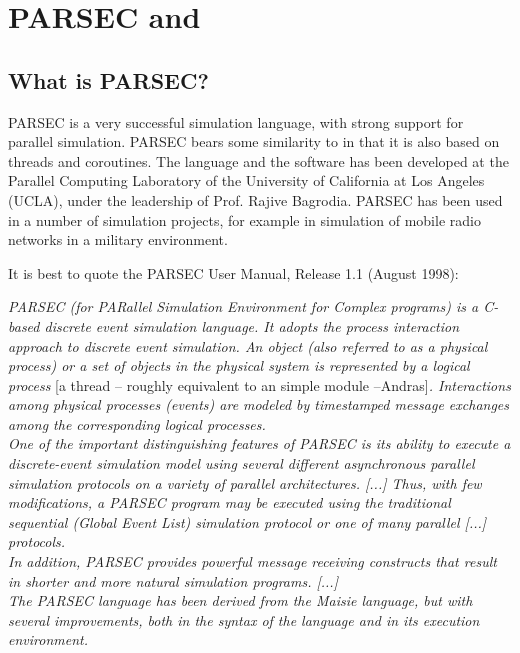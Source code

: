 \chapter{PARSEC and {\opp}}
\label{cha:parsec-and-omnet}


\section{What is PARSEC?}

PARSEC is a very successful simulation language, with
strong support for parallel simulation. PARSEC bears some similarity
to {\opp} in that it is also based on threads and coroutines. The
language and the software has been developed at the Parallel Computing
Laboratory of the University of California at Los Angeles (UCLA),
under the leadership of Prof. Rajive Bagrodia. PARSEC has been used in
a number of simulation projects, for example in simulation of mobile
radio networks in a military environment.


It is best to quote the PARSEC User Manual, Release 1.1 (August
1998):


\textit{PARSEC (for PARallel Simulation Environment for Complex
  programs) is a C-based discrete event simulation language. It adopts
  the process interaction approach to discrete event simulation. An
  object (also referred to as a physical process) or a set of objects
  in the physical system is represented by a logical process} [a
thread -- roughly equivalent to an {\opp} simple module
--Andras]\textit{. Interactions among physical processes (events) are
  modeled by timestamped message exchanges among the corresponding
  logical  processes.\\
  One of the important distinguishing features of PARSEC is its
  ability to execute a discrete-event simulation model using several
  different asynchronous parallel simulation protocols on a variety of
  parallel architectures. [...] Thus, with few modifications, a PARSEC
  program may be executed using the traditional sequential (Global
  Event List) simulation protocol or one of many parallel
  [...] protocols.\\
  In addition, PARSEC provides powerful message receiving constructs
  that result in shorter and more natural simulation programs.
  [...]\\
  The PARSEC language has been derived from the Maisie language, but
  with several improvements, both in the syntax of the language
  and in its execution environment.}

